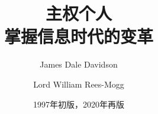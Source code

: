 \documentclass[fontset=fandol,11pt,a4paper]{ctexbook}%
\begin{document}
\title{\Huge{\textbf{主权个人}}\\ \large{掌握信息时代的变革}}
\author{James Dale Davidson
	\and Lord William Rees-Mogg}
\date{1997年初版，2020年再版}



\maketitle
\thispagestyle{empty} 	%

\pagestyle{empty}


\renewcommand\contentsname{目录} %
\tableofcontents %
\pagestyle{empty} %

\newpage
\mainmatter
\pagestyle{headings} %
\end{document}
